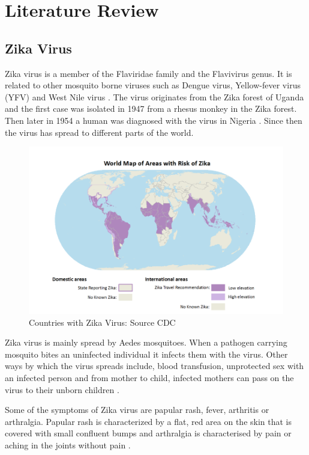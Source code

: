 \chapter{Literature Review}
\section{Zika Virus}
Zika virus is a member of the Flaviridae family
and the Flavivirus genus.
It is related to other mosquito borne viruses such as Dengue virus, Yellow-fever  virus (YFV)  and West Nile virus \citep{doi}.
The virus originates from the Zika forest of Uganda and the first case was isolated in 1947 from a rhesus monkey in the Zika forest. Then later in 1954 a human was diagnosed with the virus in Nigeria \citep{2015zika}. Since then the virus has spread to different parts of the world. 
\begin{figure}[h!]
\centering
\includegraphics[scale=0.5]{images/map_zika.png} 
\caption{Countries with Zika Virus: Source CDC}\label{fig 1}
\end{figure}


Zika virus is mainly spread by Aedes mosquitoes. When a pathogen carrying mosquito bites an uninfected individual it infects them with the virus.
Other ways  by which the virus spreads include,
blood transfusion, unprotected sex with an infected person and from mother to child, infected mothers can pass on the virus to their unborn children \citep{musso2014}.

Some of the symptoms of Zika virus  are papular rash, fever, arthritis or arthralgia. Papular rash is  characterized by a flat, red area on the skin that is covered with small confluent bumps and arthralgia is characterised by pain or aching in the joints without pain \citep{musso2015}.

